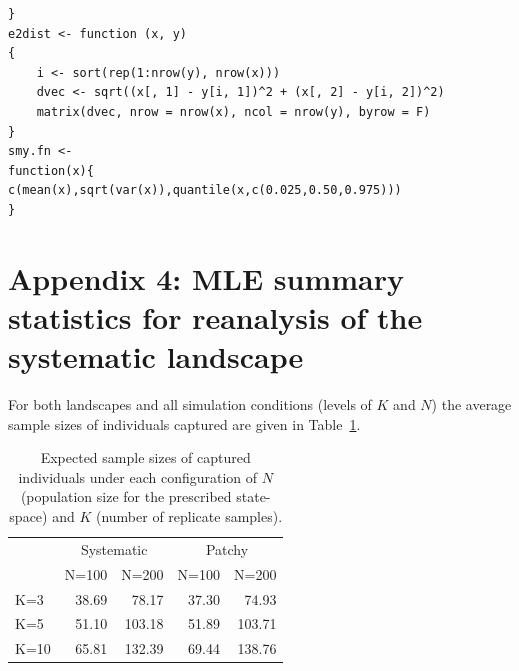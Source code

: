 \documentclass[12pt]{article}
\begin{document}
\begin{spacing}{1.2}
{\begin{verbatim}
}
e2dist <- function (x, y)
{
    i <- sort(rep(1:nrow(y), nrow(x)))
    dvec <- sqrt((x[, 1] - y[i, 1])^2 + (x[, 2] - y[i, 2])^2)
    matrix(dvec, nrow = nrow(x), ncol = nrow(y), byrow = F)
}
smy.fn <-
function(x){
c(mean(x),sqrt(var(x)),quantile(x,c(0.025,0.50,0.975)))
}
\end{verbatim}
}

\newpage


\section*{Appendix 4:  MLE summary statistics for reanalysis of the
  systematic landscape}


For both landscapes and all simulation conditions (levels of $K$ and
$N$) the average sample sizes of individuals captured are given in
Table~\ref{tab.samplesize}.  


\begin{table}[ht]
\centering
\caption{
Expected sample sizes of captured individuals under each configuration of
$N$ (population size for the prescribed state-space) and $K$ (number of replicate samples).
}
\begin{tabular}{l|rrrr}
 & \multicolumn{2}{c}{Systematic} & \multicolumn{2}{c}{Patchy}  \\
    & N=100 &  N=200  &   N=100 &  N=200  \\ \hline
K=3 &  38.69 &   78.17  &   37.30 &   74.93  \\
K=5 &  51.10 &  103.18  &   51.89 &  103.71 \\
K=10&  65.81 &  132.39  &   69.44 &  138.76 \\
\end{tabular}
\label{tab.samplesize}
\end{table}




\end{spacing}
\end{document}
